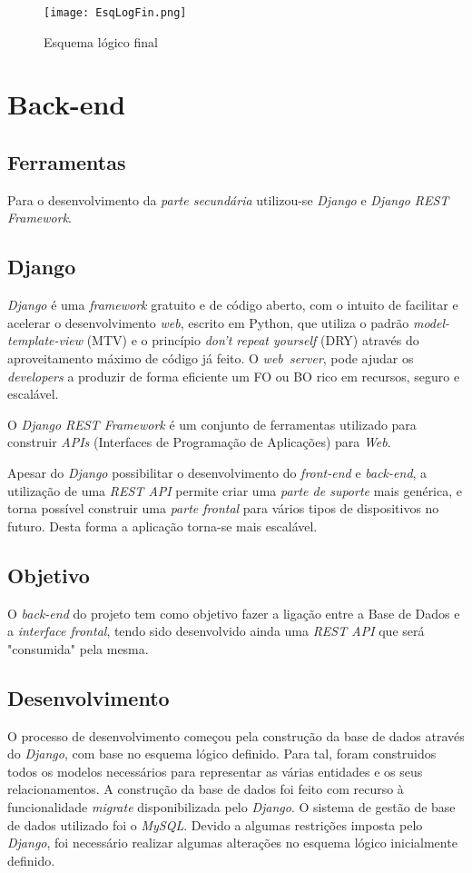 \documentclass[11pt,a4paper]{report}
\begin{document}
\begin{figure}[h]
\centering
\texttt{[image: EsqLogFin.png]}
\caption{Esquema lógico final}
\label{fig:EsqLogFini}
\end{figure}

\chapter{Back-end}

\section{Ferramentas}

Para o desenvolvimento da  \emph{parte secundária} utilizou-se \emph{Django} e \emph{Django REST Framework}.

\section{Django}

\emph{Django} é uma \emph{framework} gratuito e de código aberto, com o intuito de facilitar e acelerar o desenvolvimento \emph{web}, escrito em Python, que utiliza o padrão \emph{model-template-view} (MTV) e o princípio \emph{don't repeat yourself} (DRY) através do aproveitamento máximo de código já feito. O \emph{web\ server}, pode ajudar os \emph{developers} a produzir de forma eficiente um FO ou BO rico em recursos, seguro e escalável.

O \emph{Django REST Framework} é um conjunto de ferramentas utilizado para construir \emph{APIs} (Interfaces de Programação de Aplicações) para \emph{Web}.

Apesar do \emph{Django} possibilitar o desenvolvimento do \emph{front-end} e \emph{back-end}, a utilização de uma \emph{REST API} permite criar uma \emph{parte de suporte} mais genérica, e torna possível construir uma \emph{parte frontal} para vários tipos de dispositivos no futuro. Desta forma a aplicação torna-se mais escalável. 

\section{Objetivo}

O \emph{back-end} do projeto tem como objetivo fazer a ligação entre a Base de Dados e a \emph{interface frontal}, tendo sido desenvolvido ainda uma \emph{REST API} que será "consumida" pela mesma.
\newpage
\section{Desenvolvimento}
O processo de desenvolvimento começou pela construção da base de dados através do \emph{Django}, com base no esquema lógico definido. Para tal, foram construidos todos os modelos necessários para representar as várias entidades e os seus relacionamentos. A construção da base de dados foi feito com recurso à funcionalidade \emph{migrate} disponibilizada pelo \emph{Django}. O sistema de gestão de base de dados utilizado foi o \emph{MySQL}.
Devido a algumas restrições imposta pelo \emph{Django}, foi necessário realizar algumas alterações no esquema lógico inicialmente definido.
\end{document}
